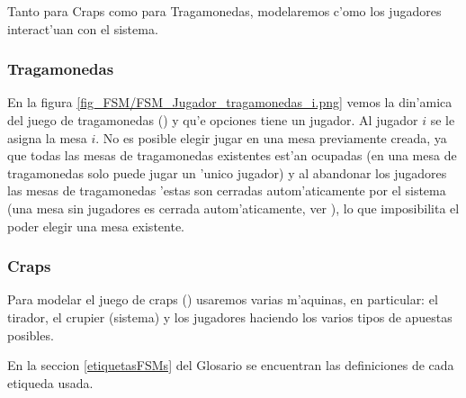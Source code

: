\newcommand{\ronda}{\italica{FSM Ronda}}
\newcommand{\crupier}{\italica{FSM Crupier}}
\newcommand{\tirador}{\italica{FSM Tirador i}}
\newcommand{\dados}{\italica{FSM Dados i}}
\newcommand{\campo}{\italica{FSM Jugador i haciendo apuesta de Campo }}
\newcommand{\sitio}{\italica{FSM Jugador i haciendo apuesta de sitio}}
\newcommand{\pase}{\italica{FSM Jugador i haciendo apuesta linea de pase / barra No Pase}}
\newcommand{\venir}{\italica{FSM Jugador i haciendo apuesta venir / no venir}}

Tanto para Craps como para Tragamonedas, modelaremos c'omo los jugadores interact'uan con el sistema.

\subsubsection{Tragamonedas}

En la figura \ref{fig_FSM/FSM_Jugador_tragamonedas_i.png} vemos la din'amica del juego de tragamonedas () y qu'e opciones tiene un jugador.
Al jugador $i$ se le asigna la mesa $i$. No es posible elegir jugar en una mesa previamente creada, ya que todas las mesas de tragamonedas existentes est'an ocupadas (en una mesa de tragamonedas solo puede jugar un 'unico jugador) y al abandonar los jugadores las mesas de tragamonedas 'estas son cerradas autom'aticamente por el sistema (una mesa sin jugadores es cerrada autom'aticamente, ver ), lo que imposibilita el poder elegir una mesa existente.

\clearpage


\subsubsection{Craps}
\label{FSM:Craps}
Para modelar el juego de craps () usaremos varias m'aquinas, en particular: el tirador, el crupier (sistema) y los jugadores haciendo los varios tipos de apuestas posibles. 

En la seccion \ref{etiquetasFSMs} del Glosario se encuentran las definiciones de cada etiqueda usada.

